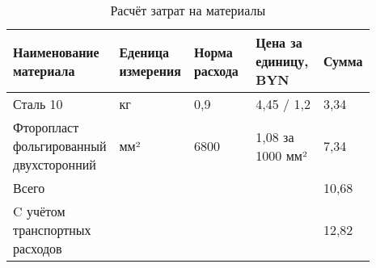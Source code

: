 \begin{table}[H]
  \small
  \caption{Расчёт затрат на материалы}
  \begin{tabular}{|p{0.2\linewidth} | p{0.2\linewidth}| p{0.2\linewidth} |p{0.2\linewidth}| p{0.09\linewidth} |}
    \hline
Наименование материала & Еденица измерения & Норма расхода & Цена за единицу, BYN & Сумма\\[0pt]
\hline
    Сталь 10 & кг & 0,9 & 4,45 / 1,2 & 3,34\\[0pt]
    \hline
    Фторопласт фольгированный двухсторонний & мм² & 6800 & 1,08 за 1000  мм² & 7,34\\[0pt]
    \hline
    Всего &  &  &  & 10,68 \\[0pt]
    \hline
    C учётом транспортных расходов &  &  &  & 12,82 \\[0pt]
    \hline
\end{tabular}
\end{table}

